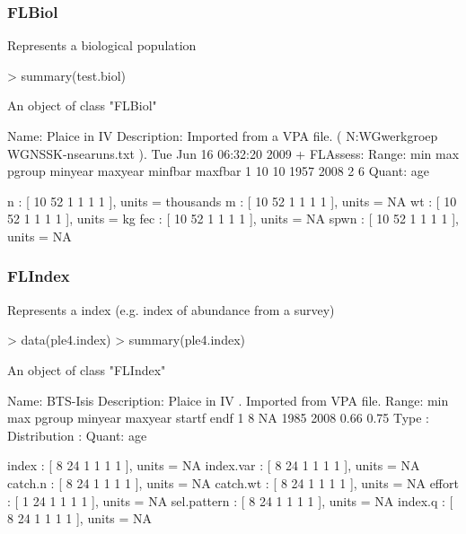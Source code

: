 \documentclass{beamer}%
\begin{document}
\begin{frame}[containsverbatim]
  \frametitle{FLBiol}
Represents a biological population
{\tiny{
\begin{Schunk}
\begin{Sinput}
> summary(test.biol)
\end{Sinput}
\begin{Soutput}
An object of class "FLBiol"

Name: Plaice in IV 
Description: Imported from a VPA file. ( N:\Projecten\ICES WG\Demersale werkgroep WGNSSK\stock\ple-nsea\final runs\index.txt ).  Tue Jun 16 06:32:20 2009 + FLAssess:  
Range:	 min	max	pgroup	minyear	maxyear	minfbar	maxfbar 
	1	10	10	1957	2008	2	6	
Quant: age 

n             : [ 10 52 1 1 1 1 ], units =  thousands 
m             : [ 10 52 1 1 1 1 ], units =  NA 
wt            : [ 10 52 1 1 1 1 ], units =  kg 
fec           : [ 10 52 1 1 1 1 ], units =  NA 
spwn          : [ 10 52 1 1 1 1 ], units =  NA 
\end{Soutput}
\end{Schunk}
}}
\end{frame}
\begin{frame}[containsverbatim]
  \frametitle{FLIndex}
Represents a index (e.g. index of abundance from a survey)
{\tiny{
\begin{Schunk}
\begin{Sinput}
> data(ple4.index)
> summary(ple4.index)
\end{Sinput}
\begin{Soutput}
An object of class "FLIndex"

Name: BTS-Isis 
Description: Plaice in IV . Imported from VPA file. 
Range:	 min	max	pgroup	minyear	maxyear	startf	endf 
	1	8	NA	1985	2008	0.66	0.75	
Type :   
Distribution :   
Quant: age 

index         : [ 8 24 1 1 1 1 ], units =  NA 
index.var     : [ 8 24 1 1 1 1 ], units =  NA 
catch.n       : [ 8 24 1 1 1 1 ], units =  NA 
catch.wt      : [ 8 24 1 1 1 1 ], units =  NA 
effort        : [ 1 24 1 1 1 1 ], units =  NA 
sel.pattern   : [ 8 24 1 1 1 1 ], units =  NA 
index.q       : [ 8 24 1 1 1 1 ], units =  NA 
\end{Soutput}
\end{Schunk}
}}



\end{frame}
\end{document}
